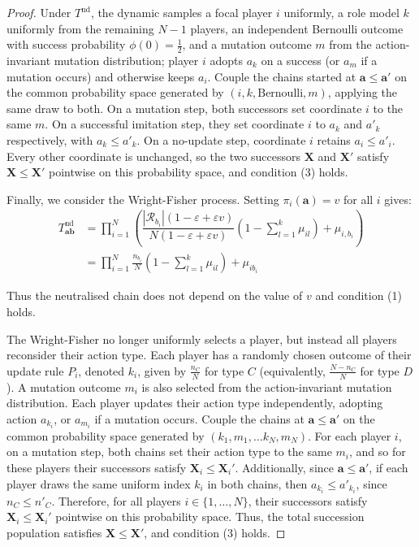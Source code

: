 \documentclass{article}
\begin{document}
\begin{proof}
    Under \(T^{\mathrm{nd}}\), the dynamic samples a focal player \(i\)
    uniformly, a role model \(k\) uniformly from the remaining \(N - 1\)
    players, an independent Bernoulli outcome with success probability \(\phi(0)
    = \frac{1}{2}\), and a mutation outcome \(m\) from the action-invariant
    mutation distribution; player \(i\) adopts \(a_k\) on a success (or \(a_m\)
    if a mutation occurs) and otherwise keeps \(a_i\). Couple the chains started
    at \(\mathbf{a} \leq \mathbf{a}'\) on the common probability space generated
    by \((i, k, \text{Bernoulli}, m)\), applying the same draw to both. On a
    mutation step, both successors set coordinate \(i\) to the same \(m\). On a
    successful imitation step, they set coordinate \(i\) to \(a_k\) and \(a'_k\)
    respectively, with \(a_k \leq a'_k\). On a no-update step, coordinate \(i\)
    retains \(a_i \leq a'_i\). Every other coordinate is unchanged, so the two
    successors \(\mathbf{X}\) and \(\mathbf{X}'\) satisfy \(\mathbf{X} \leq
    \mathbf{X}'\) pointwise on this probability space, and condition (3) holds.

    Finally, we consider the Wright-Fisher process. Setting \(\pi_i(\mathbf{a})
    = v\) for all \(i\) gives:
    \[
        \begin{aligned}
         T_\mathbf{ab}^{\mathrm{nd}} &= \prod_{i=1}^N
        \left(\dfrac{|\mathcal{R}_{b_i}|(1 - \varepsilon + \varepsilon v)}{N(1 - \varepsilon +
        \varepsilon v)}\left(1 - \sum_{l=1}^k \mu_{il}\right)+ \mu_{i,
        b_{i}}\right)\\ &= \prod_{i=1}^N \frac{n_{b_i}}{N}\left(1
        - \sum_{l=1}^k \mu_{il}\right)+ \mu_{i b_{i}}
        \end{aligned}
    \]
    
    Thus the neutralised chain does not depend on the value of \(v\) and
    condition (1) holds.

    The Wright-Fisher no longer uniformly selects a player, but instead all
    players reconsider their action type. Each player has a randomly chosen
    outcome of their update rule \(P_i\), denoted \(k_i\), given by
    \(\frac{n_C}{N}\) for type \(C\) (equivalently, \(\frac{N-n_C}{N}\) for type
    \(D\)). A mutation outcome \(m_i\) is also selected from the
    action-invariant mutation distribution. Each player updates their action
    type independently, adopting action \(a_{k_i}\), or \(a_{m_i}\) if a
    mutation occurs. Couple the chains at \(\mathbf{a} \leq \mathbf{a'}\) on the
    common probability space generated by \((k_1, m_1, \dots k_N, m_N)\). For
    each player \(i\), on a mutation step, both chains set their action type to
    the same \(m_i\), and so for these players their successors satisfy
    \(\mathbf{X}_i \leq \mathbf{X}_i'\). Additionally, since \(\mathbf{a} \leq
    \mathbf{a'}\), if each player draws the same uniform index \(k_i\) in both
    chains, then \(a_{k_i} \leq a'_{k_i}\), since \(n_C \leq n'_C\). Therefore,
    for all players \(i \in \{1, \dots, N\}\), their successors satisfy
    \(\mathbf{X}_i \leq \mathbf{X}_i'\) pointwise on this probability space.
    Thus, the total succession population satisfies \(\mathbf{X} \leq
    \mathbf{X}'\), and condition (3) holds.
\end{proof}
\end{document}
